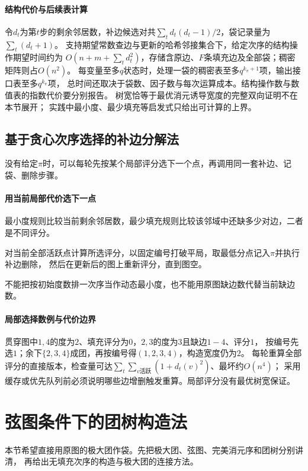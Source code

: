 \paragraph{结构代价与后续表计算}
令$d_t$为第$t$步的剩余邻居数，补边候选对共$\sum_t d_t(d_t-1)/2$，袋记录量为$\sum_t(d_t+1)$。
支持期望常数查边与更新的哈希邻接集合下，给定次序的结构操作期望时间约为
$O(n+m+\sum_t d_t^2)$，存储含原边、$F$条填充边及全部袋；稠密矩阵则占$O(n^2)$。
每变量至多$q$状态时，处理一袋的稠密表至多$q^{k_\pi+1}$项，输出接口表至多$q^{k_\pi}$项，
总时间还取决于袋数、因子数与每次运算成本。结构操作数与数值表的指数代价要分别报告。
树宽恰等于最优消元诱导宽度的完整双向证明不在本节展开；
实践中最小度、最少填充等启发式只给出可计算的上界。

\subsection{基于贪心次序选择的补边分解法}

没有给定$\pi$时，可以每轮先按某个局部评分选下一个点，再调用同一套补边、记袋、删除步骤。
\paragraph{用当前局部代价选下一点}
最小度规则比较当前剩余邻居数，最少填充规则比较该邻域中还缺多少对边，二者是不同评分。
\begin{algorithm}[贪心消元次序]
  对当前全部活跃点计算所选评分，以固定编号打破平局，取最低分点记入$\pi$并执行补边删除，
  然后在更新后的图上重新评分，直到图空。
\end{algorithm}
不能把按初始度数排一次序当作动态最小度，也不能用原图缺边数代替当前缺边数。

\paragraph{局部选择数例与代价边界}
贯穿图中$1,4$的度为$2$、填充评分为$0$，$2,3$的度为$3$且缺边$1-4$、评分$1$，
按编号先选$1$；余下$\{2,3,4\}$成团，再按编号得$(1,2,3,4)$，构造宽度仍为$2$。
每轮重算全部评分的直接版本，检查量可达$\sum_t\sum_{v\text{活跃}}(1+d_t(v)^2)$、最坏约$O(n^4)$；
采用缓存或优先队列前必须说明哪些边增删触发重算。局部评分没有最优树宽保证。

\section{弦图条件下的团树构造法}
\label{sec:graph-theory-chordal-elimination}

本节希望直接用原图的极大团作袋。先把极大团、弦图、完美消元序和团树分别讲清，
再给出无填充次序的构造与极大团的连接方法。

